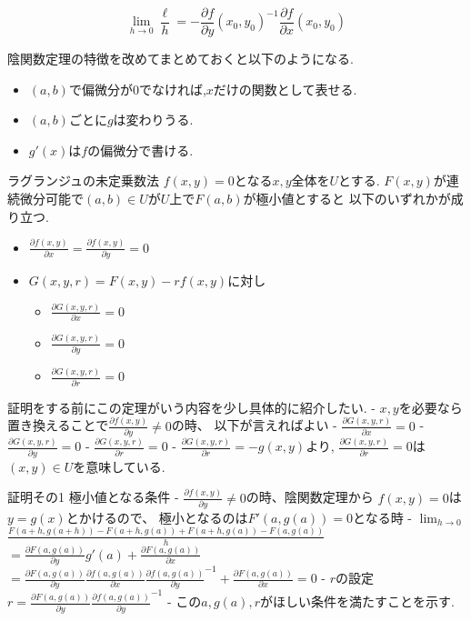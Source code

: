   $$\lim_{h \to 0} \frac{\ell}{h} = - \frac{\partial f}{\partial y}(x_0, y_0)^{-1} \frac{\partial f}{\partial x} (x_0, y_0)$$


\begin{rem}
陰関数定理の特徴を改めてまとめておくと以下のようになる.
\begin{itemize}
\item $(a, b)$で偏微分が0でなければ,$x$だけの関数として表せる.
\item $(a, b)$ごとに$g$は変わりうる.
\item $g'(x)$は$f$の偏微分で書ける.
\end{itemize}
\end{rem}

\begin{thm}
ラグランジュの未定乗数法
$f(x ,y) = 0$となる$x, y$全体を$U$とする.
$F(x, y)$が連続微分可能で$(a, b) \in U$が$U$上で$F(a, b)$が極小値とすると
  以下のいずれかが成り立つ.
 \begin{itemize}
  \item $\frac{\partial f(x, y)}{\partial x} = \frac{\partial f(x, y)}{\partial y} = 0$
  \item $G(x, y, r) = F(x, y) - r f(x, y)$に対し
  \begin{itemize}
    \item $\frac{\partial G(x, y, r)}{\partial x} = 0$
    \item $\frac{\partial G(x, y, r)}{\partial y} = 0$
    \item $\frac{\partial G(x, y, r)}{\partial r} = 0$
  \end{itemize}
 \end{itemize}
\end{thm}
証明をする前にこの定理がいう内容を少し具体的に紹介したい.
- $x, y$を必要なら置き換えることで$\frac{\partial f(x, y)}{\partial y} \neq 0$の時、
  以下が言えればよい
  - $\frac{\partial G(x, y, r)}{\partial x} = 0$
  - $\frac{\partial G(x, y, r)}{\partial y} = 0$
  - $\frac{\partial G(x, y, r)}{\partial r} = 0$
- $\frac{\partial G(x, y, r)}{\partial r} = - g(x, y)$より,
  $\frac{\partial G(x, y, r)}{\partial r} = 0$は$(x ,y) \in U$を意味している.


証明その1 極小値となる条件
- $\frac{\partial f(x, y)}{\partial y} \neq 0$の時、陰関数定理から
  $f(x, y) = 0$は$y = g(x)$とかけるので、
  極小となるのは$F'(a, g(a)) = 0$となる時
- $\displaystyle \lim_{h \to 0}$ $\frac{F(a + h, g(a+h)) - F(a+h, g(a)) + F(a+h, g(a)) - F(a,g(a))}{h}$
  $= \frac{\partial F(a, g(a))}{\partial y} g'(a) + \frac{\partial F(a, g(a))}{\partial x}$
  $= \frac{\partial F(a, g(a))}{\partial y} \frac{\partial f(a, g(a))}{\partial x} \frac{\partial f(a, g(a))}{\partial y}^{-1} + \frac{\partial F(a, g(a))}{\partial x} = 0$
- $r$の設定
  $r= \frac{\partial F(a, g(a))}{\partial y} \frac{\partial f(a, g(a))}{\partial y}^{-1}$
- この$a, g(a), r$がほしい条件を満たすことを示す.


